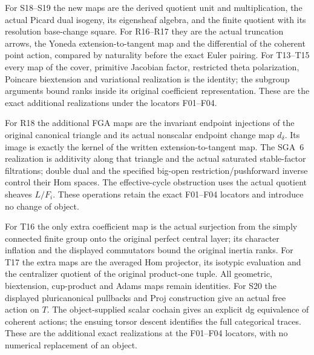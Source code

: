 For S18--S19 the new maps are the derived quotient unit and multiplication,
the actual Picard dual isogeny, its eigensheaf algebra, and the finite
quotient with its resolution base-change square. For R16--R17 they are
the actual truncation arrows, the Yoneda extension-to-tangent map and
the differential of the coherent point action, compared by naturality
before the exact Euler pairing. For T13--T15 every map of the cover,
primitive Jacobian factor, restricted theta polarization, Poincare
biextension and variational realization is the identity; the subgroup
arguments bound ranks inside its original coefficient representation.
These are the exact additional realizations under the locators F01--F04.


For R18 the additional FGA maps are the invariant endpoint injections
of the original canonical triangle and its actual nonscalar endpoint
change map $d_\delta$. Its image is exactly the kernel of the written
extension-to-tangent map. The SGA~6 realization is additivity along
that triangle and the actual saturated stable-factor filtrations;
double dual and the specified big-open restriction/pushforward inverse
control their Hom spaces. The effective-cycle obstruction uses the
actual quotient sheaves $L/F_i$. These operations retain the exact
F01--F04 locators and introduce no change of object.


For T16 the only extra coefficient map is the actual surjection from
the simply connected finite group onto the original perfect central
layer; its character inflation and the displayed commutators bound the
original inertia ranks. For T17 the extra maps are the averaged Hom
projector, its isotypic evaluation and the centralizer quotient of the
original product-one tuple. All geometric, biextension, cup-product and
Adams maps remain identities. For S20 the displayed pluricanonical
pullbacks and Proj construction give an actual free action on $T$.
The object-supplied scalar cochain gives an explicit dg equivalence
of coherent actions; the ensuing torsor descent identifies the full
categorical traces. These are the additional exact realizations at
the F01--F04 locators, with no numerical replacement of an object.



